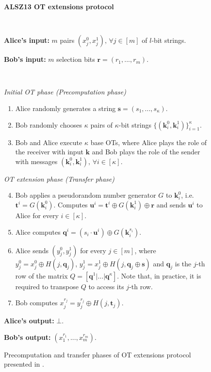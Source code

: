 \begin{figure}[t]
    \centering
        \begin{tcolorbox}
                        
			\centerline{\textbf{ALSZ13 OT extensions protocol \citep{ALSZ13}}}
            
			\ 

			\textbf{Alice's input:} $m$ pairs $(x^0_j, x^1_j),\, \forall j\in[m]$ of $l$-bit strings.
            
			\textbf{Bob's input:} $m$ selection bits $\bm{r} = (r_1, ..., r_m)$.

			\
			
			\textit{Initial OT phase (Precomputation phase)}
    \begin{enumerate}
         \item Alice randomly generates a string $\bm{s} = (s_1, ..., s_\kappa)$.
         \item Bob randomly chooses $\kappa$ pairs of $\kappa$-bit strings $\{(\bm{k}^0_i, \bm{k}^1_i)\}^\kappa_{i=1}$.
         \item Bob and Alice execute $\kappa$ base OTs, where Alice plays the role of the receiver with input $\bm{k}$ and Bob plays the role of the sender with messages $(\bm{k}^0_i, \bm{k}^1_i),\, \forall i\in[\kappa]$.
    \end{enumerate}
    \textit{OT extension phase (Transfer phase)}
    \begin{enumerate}
    \setcounter{enumi}{3}
        \item Bob applies a pseudorandom number generator $G$ to $\bm{k}^0_i$, i.e. $\bm{t}^i = G(\bm{k}^0_i)$. Computes $\bm{u}^i = \bm{t}^i \oplus G(\bm{k}^1_i) \oplus \bm{r}$ and sends $\bm{u}^i$ to Alice for every $ i\in[\kappa]$.
        \item Alice computes $\bm{q}^i = (s_i \cdot \bm{u}^i) \oplus G(\bm{k}^{s_i}_i)$.
        \item Alice sends $(y^0_j, y^1_j)$ for every $j\in[m]$, where $y^0_j = x^0_j\oplus H(j,\bm{q}_j)$, $y^1_j = x^1_j\oplus H(j,\bm{q}_j\oplus \bm{s})$ and $\bm{q}_j$ is the $j$-th row of the matrix $Q = [ \bm{q}^1 | ...| \bm{q}^\kappa]$. Note that, in practice, it is required to transpose $Q$ to access its $j$-th row.
        \item Bob computes $x^{r_j}_j = y^{r_j}_j \oplus H(j, \bm{t}_j)$.
    \end{enumerate} 
    
				\textbf{Alice's output:} $\bot$.
    
				\textbf{Bob's output:} $(x^{r_1}_1, ..., x^{r_m}_m)$.

        
        \end{tcolorbox}
    \caption{Precomputation and transfer phases of OT extensions protocol presented in \cite{ALSZ13}.}
    \label{fig:ALSZ13Protocol}
\end{figure}

